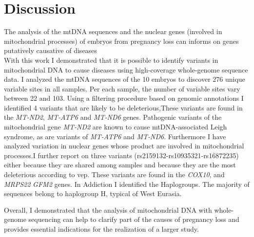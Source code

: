 \chapter{Discussion}

The analysis of the mtDNA sequences and the nuclear genes (involved in mitochondrial processes) of embryos from pregnancy loss can informs on genes putatively causative of diseases \\
 With this work I demonstrated that it is possible to identify variants in mitochondrial DNA to cause diseases using high-coverage whole-genome sequence data.
 I analyzed the mtDNA sequences of the 10 embryos to discover 276 unique variable sites in all samples. Per each sample, the number of variable sites vary between 22 and 103. Using a filtering procedure  based on genomic annotations I identified 4 variants that are likely to be deleterious,These variants are found in the \textit {MT-ND2}, \textit{MT-ATP6} and \textit{MT-ND6} genes. 
Pathogenic variants of the mitochondrial gene \textit{MT-ND2} are known to cause mtDNA-associated Leigh syndrome, as are variants of \textit{MT-ATP6} and \textit{MT-ND6}. 
Furthermore I have analyzed variation in nuclear genes whose product are involved in mitochondrial processes.I further report on three variants (rs2159132-rs10935321-rs16872235) either because they are shared among samples and because they are the most deleterious according to vep. These variants are found in the \textit{COX10}, and \textit{MRPS22} \textit{GFM2} genes.
In Addiction I identified the Haplogroups.
The majority of sequences belong to haplogroup H, typical of West Eurasia.







Overall, I demonstrated that the analysis of mitochondrial DNA with whole-genome sequencing  can help to clarify part of the causes of pregnancy loss and provides essential indications for the realization of a larger study.



